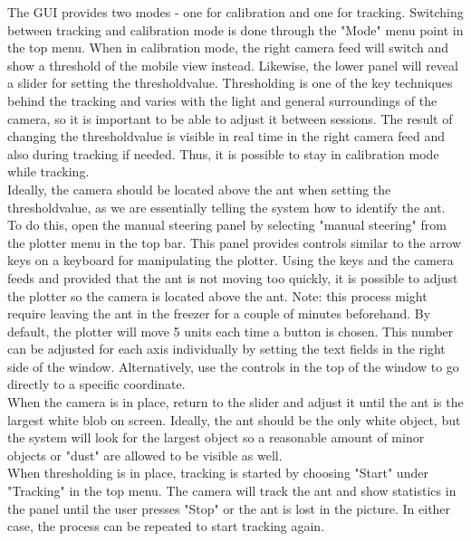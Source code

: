 The GUI provides two modes - one for calibration and one for tracking. Switching between tracking and calibration mode is done through the "Mode" menu point in the top menu. When in calibration mode, the right camera feed will switch and show a threshold of the mobile view instead. Likewise, the lower panel will reveal a slider for setting the thresholdvalue. Thresholding is one of the key techniques behind the tracking and varies with the light and general surroundings of the camera, so it is important to be able to adjust it between sessions. The result of changing the thresholdvalue is visible in real time in the right camera feed and also during tracking if needed. Thus, it is possible to stay in calibration mode while tracking. \\

Ideally, the camera should be located above the ant when setting the thresholdvalue, as we are essentially telling the system how to identify the ant. To do this, open the manual steering panel by selecting "manual steering" from the plotter menu in the top bar. This panel provides controls similar to the arrow keys on a keyboard for manipulating the plotter. Using the keys and the camera feeds and provided that the ant is not moving too quickly, it is possible to adjust the plotter so the camera is located above the ant. Note: this process might require leaving the ant in the freezer for a couple of minutes beforehand. By default, the plotter will move 5 units each time a button is chosen. This number can be adjusted for each axis individually by setting the text fields in the right side of the window. Alternatively, use the controls in the top of the window to go directly to a specific coordinate. \\

When the camera is in place, return to the slider and adjust it until the ant is the largest white blob on screen. Ideally, the ant should be the only white object, but the system will look for the largest object so a reasonable amount of minor objects or "dust" are allowed to be visible as well. \\

When thresholding is in place, tracking is started by choosing "Start" under "Tracking" in the top menu. The camera will track the ant and show statistics in the panel until the user presses "Stop" or the ant is lost in the picture. In either case, the process can be repeated to start tracking again.


